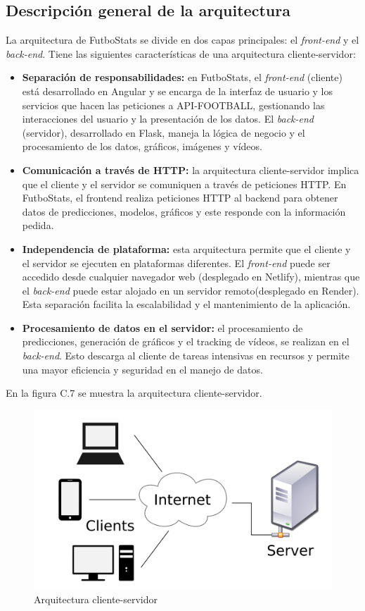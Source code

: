 \subsection{Descripción general de la arquitectura}
La arquitectura de FutboStats se divide en dos capas principales: el \textit{front-end} y el \textit{back-end}. 
Tiene las siguientes características de una arquitectura cliente-servidor:
\begin{itemize}
    \item \textbf{Separación de responsabilidades:} en FutboStats, el \textit{front-end} (cliente) está desarrollado en Angular y se encarga de la interfaz de usuario y los servicios que hacen las peticiones a API-FOOTBALL, gestionando las interacciones del usuario y la presentación de los datos. El \textit{back-end} (servidor), desarrollado en Flask, maneja la lógica de negocio y el procesamiento de los datos, gráficos, imágenes y vídeos.
    \item \textbf{Comunicación a través de HTTP:} la arquitectura cliente-servidor implica que el cliente y el servidor se comuniquen a través de peticiones HTTP. En FutboStats, el frontend realiza peticiones HTTP al backend para obtener datos de predicciones, modelos, gráficos y este responde con la información pedida.
    \item \textbf{Independencia de plataforma:} esta arquitectura permite que el cliente y el servidor se ejecuten en plataformas diferentes. El \textit{front-end} puede ser accedido desde cualquier navegador web (desplegado en Netlify), mientras que el \textit{back-end} puede estar alojado en un servidor remoto(desplegado en Render). Esta separación facilita la escalabilidad y el mantenimiento de la aplicación.
    \item \textbf{Procesamiento de datos en el servidor:} el procesamiento de predicciones, generación de gráficos y el tracking de vídeos, se realizan en el \textit{back-end}. Esto descarga al cliente de tareas intensivas en recursos y permite una mayor eficiencia y seguridad en el manejo de datos.
\end{itemize}
En la figura C.7 se muestra la arquitectura cliente-servidor.
\begin{figure}[H]
    \centering
    \includegraphics[width=0.7\linewidth]{img/cliente-servidor.png}
    \caption{Arquitectura cliente-servidor \cite{web:clienteServidor2}}
    \label{fig:enter-label}
\end{figure}

